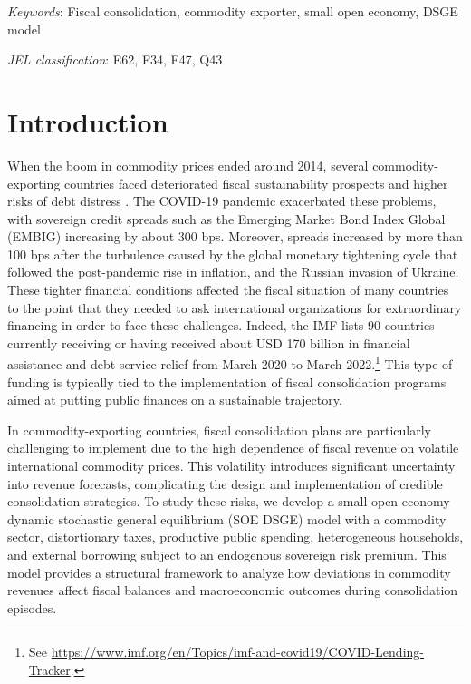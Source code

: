 \documentclass[12pt]{article}
\begin{document}
\textit{Keywords}: Fiscal consolidation, commodity exporter, small open economy, DSGE model


\textit{JEL classification}: E62, F34, F47, Q43


\thispagestyle{empty}
\setcounter{page}{0}
\clearpage
\setcounter{page}{1}


\section{Introduction}

When the boom in commodity prices ended around 2014, several commodity-exporting countries faced deteriorated fiscal sustainability prospects and higher risks of debt distress \citep[see][]{richaud2019fiscal}. The COVID-19 pandemic exacerbated these problems, with sovereign credit spreads such as the Emerging Market Bond Index Global (EMBIG) increasing by about 300 bps. Moreover, spreads increased by more than 100 bps after the turbulence caused by the global monetary tightening cycle that followed the post-pandemic rise in inflation, and the Russian invasion of Ukraine. These tighter financial conditions affected the fiscal situation of many countries to the point that they needed to ask international organizations for extraordinary financing in order to face these challenges. Indeed, the IMF lists 90 countries currently receiving or having received about USD 170 billion in financial assistance and debt service relief from March 2020 to March 2022.\footnote{See \url{https://www.imf.org/en/Topics/imf-and-covid19/COVID-Lending-Tracker}.} This type of funding is typically tied to the implementation of fiscal consolidation programs aimed at putting public finances on a sustainable trajectory. 

In commodity-exporting countries, fiscal consolidation plans are particularly challenging to implement due to the high dependence of fiscal revenue on volatile international commodity prices. This volatility introduces significant uncertainty into revenue forecasts, complicating the design and implementation of credible consolidation strategies. To study these risks, we develop a small open economy dynamic stochastic general equilibrium (SOE DSGE) model with a commodity sector, distortionary taxes, productive public spending, heterogeneous households, and external borrowing subject to an endogenous sovereign risk premium. This model provides a structural framework to analyze how deviations in commodity revenues affect fiscal balances and macroeconomic outcomes during consolidation episodes.
\end{document}
